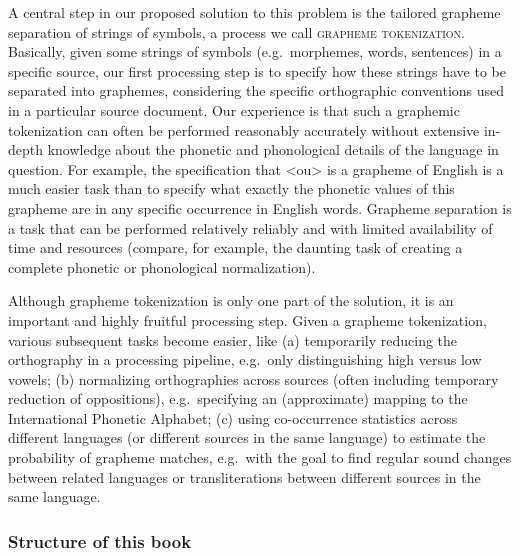 
A central step in our proposed solution to this problem is the tailored grapheme
separation of strings of symbols, a process we call \textsc{grapheme
tokenization}. Basically, given some strings of symbols (e.g.~morphemes, words,
sentences) in a specific source, our first processing step is to specify how
these strings have to be separated into graphemes, considering the specific
orthographic conventions used in a particular source document. Our experience is
that such a graphemic tokenization can often be performed reasonably accurately
without extensive in-depth knowledge about the phonetic and phonological details
of the language in question. For example, the specification that <ou> is a
grapheme of English is a much easier task than to specify what exactly the
phonetic values of this grapheme are in any specific occurrence in English
words. Grapheme separation is a task that can be performed relatively reliably
and with limited availability of time and resources (compare, for example, the
daunting task of creating a complete phonetic or phonological normalization).

Although grapheme tokenization is only one part of the solution, it is an
important and highly fruitful processing step. Given a grapheme tokenization,
various subsequent tasks become easier, like (a) temporarily reducing the
orthography in a processing pipeline, e.g.~only distinguishing high versus low
vowels; (b) normalizing orthographies across sources (often including temporary
reduction of oppositions), e.g.~specifying an (approximate) mapping to the
International Phonetic Alphabet; (c) using co-occurrence statistics across
different languages (or different sources in the same language) to estimate the
probability of grapheme matches, e.g.~with the goal to find regular sound
changes between related languages or transliterations between different sources
in the same language.

\subsubsection*{Structure of this book}

